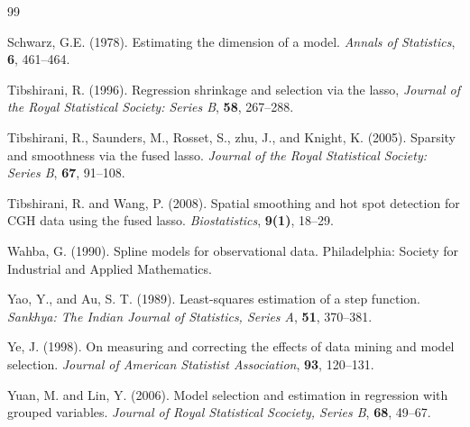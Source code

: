 \documentclass[12pt]{article}
\begin{document}
\begin{thebibliography} {99}
\item Schwarz, G.E. (1978). Estimating the dimension of a model. \emph{Annals of Statistics},
    {\bf 6}, 461--464.


\item Tibshirani, R. (1996). Regression shrinkage and selection via the lasso,
          \emph{Journal of the Royal Statistical Society: Series B},
           {\bf 58}, 267--288.

 \item Tibshirani, R., Saunders, M., Rosset, S., zhu, J., and Knight, K. (2005).
Sparsity and smoothness via the fused lasso.
\emph{Journal of the Royal Statistical Society: Series B},
\textbf{67}, 91--108.

\item Tibshirani, R. and Wang, P. (2008). Spatial smoothing and hot
spot detection for CGH data using the fused lasso.
\emph{Biostatistics}, {\bf 9(1)}, 18--29.


 \item Wahba, G. (1990).  Spline models for observational data.
 Philadelphia: Society for Industrial and Applied Mathematics.





\item Yao, Y., and Au, S. T. (1989). Least-squares estimation of a step function.
\emph{Sankhya: The Indian Journal of Statistics, Series A}, {\bf 51}, 370--381.

\item Ye, J. (1998). On measuring and correcting the effects of
data mining and model selection. \emph{Journal of American
Statistist Association},
 {\bf 93}, 120--131.

\item Yuan, M. and Lin, Y. (2006). Model selection and estimation in regression with
grouped variables. \emph{Journal of Royal Statistical Scociety, Series B}, {\bf 68}, 49--67.



\end{thebibliography}
\end{document}
